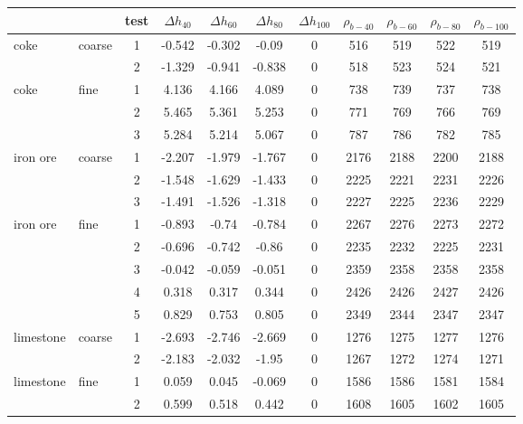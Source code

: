\begin{table}[h]
\centering
\begin{tabular}{ll|c|cccc|cccc}
\hline
          &       & test  & $\Delta h_{40}$  & $\Delta h_{60}$  & $\Delta
          h_{80}$  & $\Delta h_{100}$ & $\rho_{b-40}$ & $\rho_{b-60}$ &
          $\rho_{b-80}$ & $\rho_{b-100}$ \\
\hline          
    coke  & coarse & 1     & -0.542 & -0.302 & -0.09 & 0     & 516   & 519   & 522   & 519 \\
          &       & 2     & -1.329 & -0.941 & -0.838 & 0     & 518   & 523   & 524   & 521 \\
\hline 
    coke  & fine  & 1     & 4.136 & 4.166 & 4.089 & 0     & 738   & 739   & 737   & 738 \\
          &       & 2     & 5.465 & 5.361 & 5.253 & 0     & 771   & 769   & 766   & 769 \\
          &       & 3     & 5.284 & 5.214 & 5.067 & 0     & 787   & 786   & 782   & 785 \\
\hline 
    iron ore & coarse & 1     & -2.207 & -1.979 & -1.767 & 0     & 2176  & 2188  & 2200  & 2188 \\
          &       & 2     & -1.548 & -1.629 & -1.433 & 0     & 2225  & 2221  & 2231  & 2226 \\
          &       & 3     & -1.491 & -1.526 & -1.318 & 0     & 2227  & 2225  & 2236  & 2229 \\
\hline 
    iron ore & fine  & 1     & -0.893 & -0.74 & -0.784 & 0     & 2267  & 2276  & 2273  & 2272 \\
          &       & 2     & -0.696 & -0.742 & -0.86 & 0     & 2235  & 2232  & 2225  & 2231 \\
          &       & 3     & -0.042 & -0.059 & -0.051 & 0     & 2359  & 2358  & 2358  & 2358 \\
          &       & 4     & 0.318 & 0.317 & 0.344 & 0     & 2426  & 2426  & 2427  & 2426 \\
          &       & 5     & 0.829 & 0.753 & 0.805 & 0     & 2349  & 2344  & 2347  & 2347 \\
\hline 
    limestone & coarse & 1     & -2.693 & -2.746 & -2.669 & 0     & 1276  & 1275  & 1277  & 1276 \\
          &       & 2     & -2.183 & -2.032 & -1.95 & 0     & 1267  & 1272  & 1274  & 1271 \\
\hline 
    limestone & fine  & 1     & 0.059 & 0.045 & -0.069 & 0     & 1586  & 1586  & 1581  & 1584 \\
          &       & 2     & 0.599 & 0.518 & 0.442 & 0     & 1608  & 1605  & 1602  & 1605 \\

\end{tabular}
\end{table}
